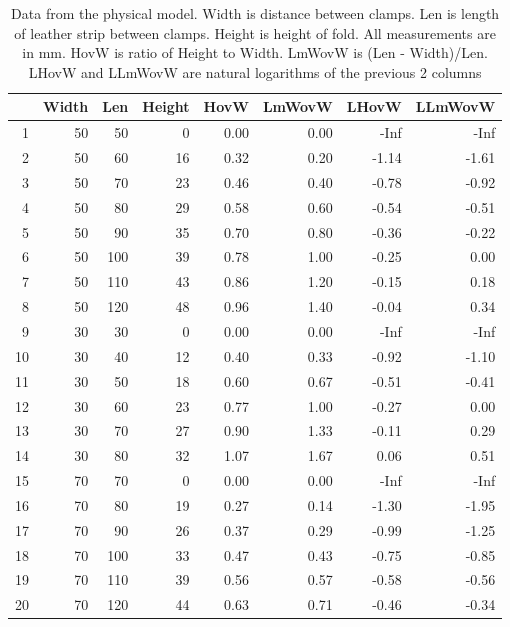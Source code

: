 \begin{table}[ht]
\centering
\caption{Data from the physical model. Width is distance between clamps. Len is length of leather strip between clamps. Height is height of fold. All measurements are in mm. HovW is ratio of Height to Width. LmWovW is (Len - Width)/Len. LHovW and LLmWovW are natural logarithms of the previous 2 columns}
\label{tab:model}
\begin{tabular}{rrrrrrrr}
  \hline
 & Width & Len & Height & HovW & LmWovW & LHovW & LLmWovW \\ 
  \hline
1 &  50 &  50 &   0 & 0.00 & 0.00 & -Inf & -Inf \\ 
  2 &  50 &  60 &  16 & 0.32 & 0.20 & -1.14 & -1.61 \\ 
  3 &  50 &  70 &  23 & 0.46 & 0.40 & -0.78 & -0.92 \\ 
  4 &  50 &  80 &  29 & 0.58 & 0.60 & -0.54 & -0.51 \\ 
  5 &  50 &  90 &  35 & 0.70 & 0.80 & -0.36 & -0.22 \\ 
  6 &  50 & 100 &  39 & 0.78 & 1.00 & -0.25 & 0.00 \\ 
  7 &  50 & 110 &  43 & 0.86 & 1.20 & -0.15 & 0.18 \\ 
  8 &  50 & 120 &  48 & 0.96 & 1.40 & -0.04 & 0.34 \\ 
  9 &  30 &  30 &   0 & 0.00 & 0.00 & -Inf & -Inf \\ 
  10 &  30 &  40 &  12 & 0.40 & 0.33 & -0.92 & -1.10 \\ 
  11 &  30 &  50 &  18 & 0.60 & 0.67 & -0.51 & -0.41 \\ 
  12 &  30 &  60 &  23 & 0.77 & 1.00 & -0.27 & 0.00 \\ 
  13 &  30 &  70 &  27 & 0.90 & 1.33 & -0.11 & 0.29 \\ 
  14 &  30 &  80 &  32 & 1.07 & 1.67 & 0.06 & 0.51 \\ 
  15 &  70 &  70 &   0 & 0.00 & 0.00 & -Inf & -Inf \\ 
  16 &  70 &  80 &  19 & 0.27 & 0.14 & -1.30 & -1.95 \\ 
  17 &  70 &  90 &  26 & 0.37 & 0.29 & -0.99 & -1.25 \\ 
  18 &  70 & 100 &  33 & 0.47 & 0.43 & -0.75 & -0.85 \\ 
  19 &  70 & 110 &  39 & 0.56 & 0.57 & -0.58 & -0.56 \\ 
  20 &  70 & 120 &  44 & 0.63 & 0.71 & -0.46 & -0.34 \\ 
   \hline
\end{tabular}
\end{table}

